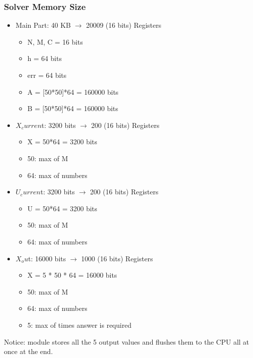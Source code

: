 \documentclass[12pt]{report}
\begin{document}
\subsubsection{Solver Memory Size}
\begin{itemize}
    \item Main Part: 40 KB $\rightarrow$ 20009 (16 bits) Registers
    \begin{itemize}
        \item N, M, C = 16 bits
        \item h = 64 bits
        \item err = 64 bits
        \item A = [50*50]*64 = 160000 bits
        \item B = [50*50]*64 = 160000 bits
    \end{itemize}
    \item $X_curren$t: 3200 bits $\rightarrow$ 200 (16 bits) Registers
    \begin{itemize}
        \item X = 50*64 = 3200 bits
        \item 50: max of M
        \item 64: max of numbers
    \end{itemize}
    \item $U_curren$t: 3200 bits $\rightarrow$ 200 (16 bits) Registers
    \begin{itemize}
        \item U = 50*64 = 3200 bits
        \item 50: max of M
        \item 64: max of numbers
    \end{itemize}
    \item $X_ou$t: 16000 bits $\rightarrow$ 1000 (16 bits) Registers
    \begin{itemize}
        \item X = 5 * 50 * 64 = 16000 bits
        \item 50: max of M
        \item 64: max of numbers
        \item 5: max of times answer is required
    \end{itemize}
\end{itemize}

Notice: module stores all the 5 output values and flushes them to the CPU all at once at the end.
\end{document}
